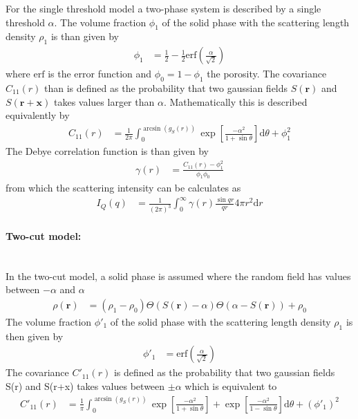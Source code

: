 For the single threshold model a two-phase system is described by a single threshold $\alpha$. The volume fraction $\phi_1$ of the solid phase with the scattering length density $\rho_1$ is than given by
\begin{align}\label{eq:volumefraction_alpha}
  \phi_1 & = \frac12 - \frac12\mathrm{erf}\left(\frac{\alpha}{\sqrt{2}}\right)
\end{align}
where $\mathrm{erf}$ is the error function and $\phi_0=1-\phi_1$ the porosity. The covariance $C_{11}(r)$ than is defined as the probability that two gaussian fields $S(\mathbf{r})$ and $S(\mathbf{r}+\mathbf{x})$ takes values larger than $\alpha$. Mathematically this is described equivalently by
\begin{align}
  C_{11}(r) &= \frac{1}{2\pi} \int_0^{\arcsin(g_S(r))} \exp\left[\frac{-\alpha^2}{1+\sin\theta}\right] \mathrm{d}\theta + \phi_1^2
\end{align}
The Debye correlation function is than given by
\begin{align}
  \gamma(r) &= \frac{C_{11}(r) -\phi_1^2}{\phi_1\phi_0}
\end{align}
from which the scattering intensity can be calculates as
\begin{align}
  I_Q(q) &= \frac{1}{(2\pi)^3}\int_0^\infty \gamma(r) \frac{\sin qr}{qr} 4\pi r^2 \mathrm{d}r
\end{align}

\paragraph*{\textbf{Two-cut model:}}\hspace{1pt} \\
In the two-cut model, a solid phase is assumed where the random field has values between $-\alpha$ and $\alpha$
\begin{align}
  \rho(\mathbf{r}) & = (\rho_1-\rho_0) \Theta(S(\mathbf{r})-\alpha) \Theta(\alpha-S(\mathbf{r}))+ \rho_0
\end{align}
 The volume fraction $\phi'_1$ of the solid phase with the scattering length density $\rho_1$ is then given
by
\begin{align}\label{eq:Phi_1_twocut}
  \phi'_1 &= \mathrm{erf} \left( \frac{\alpha}{\sqrt{2}}\right)
\end{align}
The covariance $C'_{11}(r)$ is defined as the probability that two gaussian fields S(r) and S(r+x) takes values
between $\pm \alpha$ which is equivalent to
\begin{align}\label{eq:C11twocut}
  C'_{11}(r) &= \frac{1}{\pi} \int_0^{\arcsin(g_S(r))} \exp\left[\frac{-\alpha^2}{1+\sin\theta}\right] + \exp\left[\frac{-\alpha^2}{1-\sin\theta}\right]\mathrm{d}\theta + (\phi'_1)^2
\end{align}

